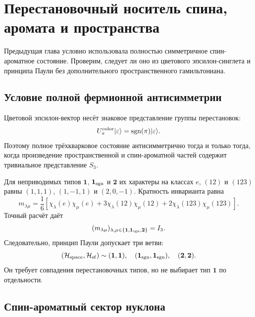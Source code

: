 \chapter{Перестановочный носитель спина, аромата и пространства}
\label{ch:v8-baryon-spin-flavor-permutation-carrier-gate}

Предыдущая глава условно использовала полностью симметричное
спин-ароматное состояние. Проверим, следует ли оно из цветового
эпсилон-синглета и принципа Паули без дополнительного пространственного
гамильтониана.

\section{Условие полной фермионной антисимметрии}

Цветовой эпсилон-вектор несёт знаковое представление группы перестановок:
\begin{equation}
 U_\pi^{\rm color}|\varepsilon\rangle
 =\operatorname{sgn}(\pi)|\varepsilon\rangle.
 \label{eq:v8-baryon-color-sign-representation}
\end{equation}
Поэтому полное трёхкварковое состояние антисимметрично тогда и только
тогда, когда произведение пространственной и спин-ароматной частей
содержит тривиальное представление $S_3$.

Для неприводимых типов
$\mathbf1$, $\mathbf1_{\rm sgn}$ и $\mathbf2$ их характеры на классах
$e$, $(12)$ и $(123)$ равны
$(1,1,1)$, $(1,-1,1)$ и $(2,0,-1)$. Кратность инварианта равна
\begin{equation}
 m_{\lambda\mu}
 =\frac16\left[
 \chi_\lambda(e)\chi_\mu(e)
 +3\chi_\lambda(12)\chi_\mu(12)
 +2\chi_\lambda(123)\chi_\mu(123)\right].
 \label{eq:v8-baryon-s3-invariant-multiplicity}
\end{equation}
Точный расчёт даёт
\begin{equation}
 (m_{\lambda\mu})_{\lambda,\mu\in
 \{\mathbf1,\mathbf1_{\rm sgn},\mathbf2\}}=I_3.
 \label{eq:v8-baryon-s3-matching-matrix}
\end{equation}
Следовательно, принцип Паули допускает три ветви:
\begin{equation}
 (\mathcal H_{\rm space},\mathcal H_{\rm sf})
 \sim(\mathbf1,\mathbf1),\quad
 (\mathbf1_{\rm sgn},\mathbf1_{\rm sgn}),\quad
 (\mathbf2,\mathbf2).
 \label{eq:v8-baryon-three-permutation-branches}
\end{equation}
Он требует совпадения перестановочных типов, но не выбирает тип
$\mathbf1$ по отдельности.

\section{Спин-ароматный сектор нуклона}

